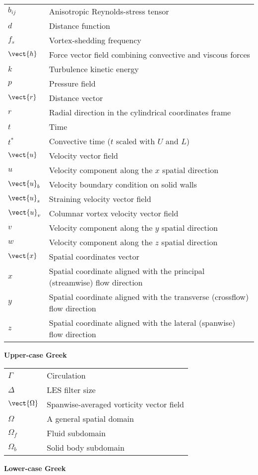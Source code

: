 \begin{longtable}[l]{ll}
$b_{ij}$ & Anisotropic Reynolds-stress tensor \tabularnewline
$d$ & Distance function\tabularnewline
$f_s$ & Vortex-shedding frequency \tabularnewline
$\vect{h}$ & Force vector field combining convective and viscous forces\tabularnewline
$k$ & Turbulence kinetic energy \tabularnewline
$p$ & Pressure field \tabularnewline
$\vect{r}$ & Distance vector\tabularnewline
$r$ & Radial direction in the cylindrical coordinates frame\tabularnewline
$t$ & Time\tabularnewline
$t^*$ & Convective time ($t$ scaled with $U$ and $L$)\tabularnewline
$\vect{u}$ & Velocity vector field\tabularnewline
$u$ & Velocity component along the $x$ spatial direction\tabularnewline
$\vect{u}_b$ & Velocity boundary condition on solid walls\tabularnewline
$\vect{u}_s$ & Straining velocity vector field\tabularnewline
$\vect{u}_v$ & Columnar vortex velocity vector field\tabularnewline
$v$ & Velocity component along the $y$ spatial direction\tabularnewline
$w$ & Velocity component along the $z$ spatial direction\tabularnewline
$\vect{x}$ & Spatial coordinates vector \tabularnewline
$x$ & Spatial coordinate aligned with the principal (streamwise) flow direction\tabularnewline
$y$ & Spatial coordinate aligned with the transverse (crossflow) flow direction\tabularnewline
$z$ & Spatial coordinate aligned with the lateral (spanwise) flow direction\tabularnewline
\end{longtable}

\textbf{{\large Upper-case Greek}}

\begin{longtable}[l]{ll}
$\Gamma$ & Circulation\tabularnewline
$\Delta$ & LES filter size\tabularnewline
$\vect{\Omega}$ & Spanwise-averaged vorticity vector field \tabularnewline
$\Omega$ & A general spatial domain \tabularnewline
$\Omega_f$ & Fluid subdomain \tabularnewline
$\Omega_b$ & Solid body subdomain \tabularnewline
\end{longtable}

\textbf{{\large Lower-case Greek}}

